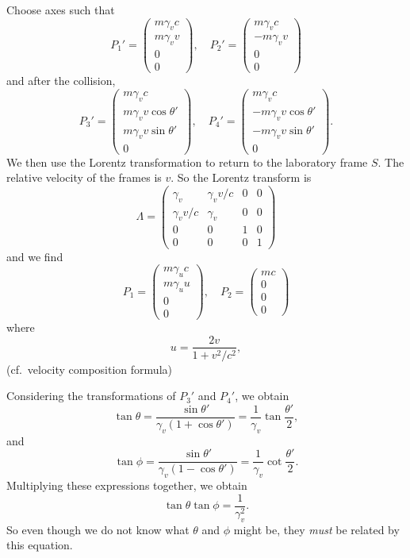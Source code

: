 \documentclass[a4paper]{article}
\begin{document}
Choose axes such that
\[
  P_1' =
  \begin{pmatrix}
    m\gamma_v c\\
    m\gamma_v v\\
    0\\
    0
  \end{pmatrix},\quad
  P_2' =
  \begin{pmatrix}
    m\gamma_v c\\
    -m\gamma_v v\\
    0\\
    0
  \end{pmatrix}
\]
and after the collision,
\[
  P_3' =
  \begin{pmatrix}
    m\gamma_v c\\
    m\gamma_v v\cos \theta'\\
    m\gamma_v v\sin \theta'\\
    0
  \end{pmatrix},\quad
  P_4' =
  \begin{pmatrix}
    m\gamma_v c\\
    -m\gamma_v v\cos \theta'\\
    -m \gamma_v v\sin \theta'\\
    0
  \end{pmatrix}.
\]
We then use the Lorentz transformation to return to the laboratory frame $S$. The relative velocity of the frames is $v$. So the Lorentz transform is
\[
  \Lambda =
  \begin{pmatrix}
    \gamma_v & \gamma_v v/c & 0 & 0\\
    \gamma_v v/c & \gamma_v & 0 & 0\\
    0 & 0 & 1 & 0\\
    0 & 0 & 0 & 1
  \end{pmatrix}
\]
and we find
\[
  P_1 =
  \begin{pmatrix}
    m\gamma_u c\\
    m\gamma_u u\\
    0\\
    0
  \end{pmatrix},\quad
  P_2 =
  \begin{pmatrix}
    mc\\
    0\\
    0\\
    0
  \end{pmatrix}
\]
where
\[
  u = \frac{2v}{1 + v^2/c^2},
\]
(cf.\ velocity composition formula)

Considering the transformations of $P_3'$ and $P_4'$, we obtain
\[
  \tan \theta = \frac{\sin \theta'}{\gamma_v (1 + \cos \theta')} = \frac{1}{\gamma_v}\tan \frac{\theta'}{2},
\]
and
\[
  \tan \phi = \frac{\sin \theta'}{\gamma_v(1 - \cos \theta')} = \frac{1}{\gamma_v}\cot \frac{\theta'}{2}.
\]
Multiplying these expressions together, we obtain
\[
  \tan \theta\tan \phi = \frac{1}{\gamma_v^2}.
\]
So even though we do not know what $\theta$ and $\phi$ might be, they \emph{must} be related by this equation.
\end{document}
